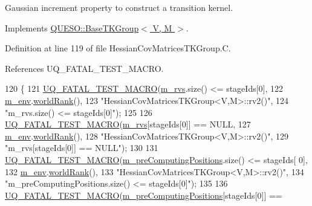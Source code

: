 Gaussian increment property to construct a transition kernel. 



Implements \hyperlink{class_q_u_e_s_o_1_1_base_t_k_group_a35eaf213217ec41a9d85b957db01a9ff}{Q\-U\-E\-S\-O\-::\-Base\-T\-K\-Group$<$ V, M $>$}.



Definition at line 119 of file Hessian\-Cov\-Matrices\-T\-K\-Group.\-C.



References U\-Q\-\_\-\-F\-A\-T\-A\-L\-\_\-\-T\-E\-S\-T\-\_\-\-M\-A\-C\-R\-O.


\begin{DoxyCode}
120 \{
121   \hyperlink{_defines_8h_a56d63d18d0a6d45757de47fcc06f574d}{UQ\_FATAL\_TEST\_MACRO}(\hyperlink{class_q_u_e_s_o_1_1_base_t_k_group_a87c6b02ea45ab3de634c22afa58f53a5}{m\_rvs}.size() <= stageIds[0],
122                       \hyperlink{class_q_u_e_s_o_1_1_base_t_k_group_a2bce5e8aa5c844d4332a0e73cf00a1f9}{m\_env}.\hyperlink{class_q_u_e_s_o_1_1_base_environment_a78b57112bbd0e6dd0e8afec00b40ffa7}{worldRank}(),
123                       \textcolor{stringliteral}{"HessianCovMatricesTKGroup<V,M>::rv2()"},
124                       \textcolor{stringliteral}{"m\_rvs.size() <= stageIds[0]"});
125 
126   \hyperlink{_defines_8h_a56d63d18d0a6d45757de47fcc06f574d}{UQ\_FATAL\_TEST\_MACRO}(\hyperlink{class_q_u_e_s_o_1_1_base_t_k_group_a87c6b02ea45ab3de634c22afa58f53a5}{m\_rvs}[stageIds[0]] == NULL,
127                       \hyperlink{class_q_u_e_s_o_1_1_base_t_k_group_a2bce5e8aa5c844d4332a0e73cf00a1f9}{m\_env}.\hyperlink{class_q_u_e_s_o_1_1_base_environment_a78b57112bbd0e6dd0e8afec00b40ffa7}{worldRank}(),
128                       \textcolor{stringliteral}{"HessianCovMatricesTKGroup<V,M>::rv2()"},
129                       \textcolor{stringliteral}{"m\_rvs[stageIds[0]] == NULL"});
130 
131   \hyperlink{_defines_8h_a56d63d18d0a6d45757de47fcc06f574d}{UQ\_FATAL\_TEST\_MACRO}(\hyperlink{class_q_u_e_s_o_1_1_base_t_k_group_a93d7fe55e30a7c6f209b01cb8a67e322}{m\_preComputingPositions}.size() <= stageIds[
      0],
132                       \hyperlink{class_q_u_e_s_o_1_1_base_t_k_group_a2bce5e8aa5c844d4332a0e73cf00a1f9}{m\_env}.\hyperlink{class_q_u_e_s_o_1_1_base_environment_a78b57112bbd0e6dd0e8afec00b40ffa7}{worldRank}(),
133                       \textcolor{stringliteral}{"HessianCovMatricesTKGroup<V,M>::rv2()"},
134                       \textcolor{stringliteral}{"m\_preComputingPositions.size() <= stageIds[0]"});
135 
136   \hyperlink{_defines_8h_a56d63d18d0a6d45757de47fcc06f574d}{UQ\_FATAL\_TEST\_MACRO}(\hyperlink{class_q_u_e_s_o_1_1_base_t_k_group_a93d7fe55e30a7c6f209b01cb8a67e322}{m\_preComputingPositions}[stageIds[0]] == 

\end{DoxyCode}
